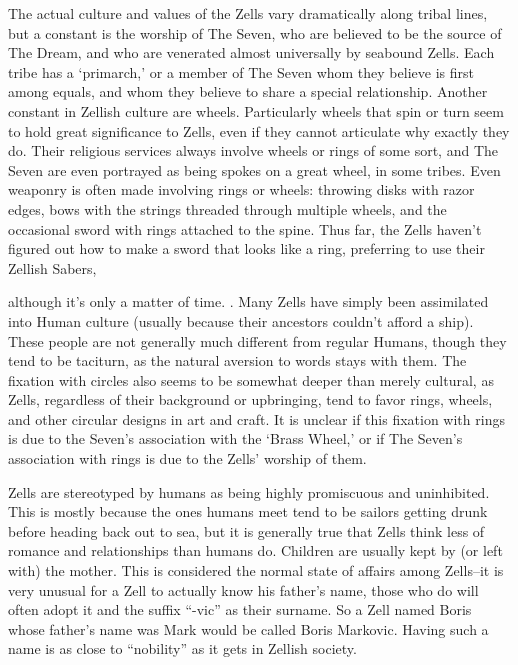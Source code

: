 \documentclass[oneside,11pt,english]{book}
\begin{document}
 

The actual culture and values of the Zells vary dramatically along tribal lines, but a constant is the 
worship of The Seven, who are believed to be the source of The Dream, and who are venerated almost 
universally by seabound Zells. Each tribe has a ‘primarch,’ or a member of The Seven whom they believe 
is first among equals, and whom they believe to share a special relationship. Another constant in Zellish 
culture are wheels. Particularly wheels that spin or turn seem to hold great significance to Zells, even if 
they cannot articulate why exactly they do. Their religious services always involve wheels or rings of 
some sort, and The Seven are even portrayed as being spokes on a great wheel, in some tribes. Even 
weaponry is often made involving rings or wheels: throwing disks with razor edges, bows with the strings 
threaded through multiple wheels, and the occasional sword with rings attached to the spine. Thus far, the 
Zells haven't figured out how to make a sword that looks like a ring, preferring to use their Zellish Sabers, 


although it's only a matter of time. 
. 
Many Zells have simply been assimilated into Human culture (usually because their ancestors couldn't 
afford a ship). These people are not generally much different from regular Humans, though they tend to 
be taciturn, as the natural aversion to words stays with them. The fixation with circles also seems to be 
somewhat deeper than merely cultural, as Zells, regardless of their background or upbringing, tend to 
favor rings, wheels, and other circular designs in art and craft. It is unclear if this fixation with rings is 
due to the Seven's association with the ‘Brass Wheel,’ or if The Seven's association with rings is due to 
the Zells' worship of them. 

 

Zells are stereotyped by humans as being highly promiscuous and uninhibited. This is mostly because the 
ones humans meet tend to be sailors getting drunk before heading back out to sea, but it is generally true 
that Zells think less of romance and relationships than humans do. Children are usually kept by (or left 
with) the mother. This is considered the normal state of affairs among Zells--it is very unusual for a Zell 
to actually know his father’s name, those who do will often adopt it and the suffix “-vic” as their surname. 
So a Zell named Boris whose father’s name was Mark would be called Boris Markovic. Having such a 
name is as close to “nobility” as it gets in Zellish society. 
\end{document}
